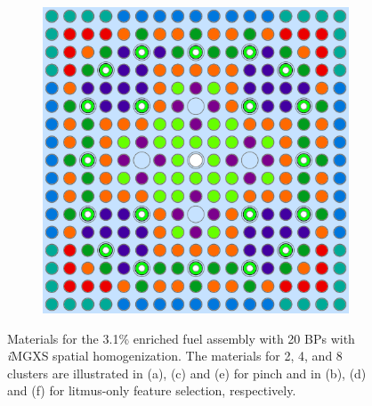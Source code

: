 \begin{figure}[h!]
\begin{subfigure}{0.47\textwidth}
  \caption{}
  \label{fig:chap10-assm-31-20BPs-pinch-8}
\end{subfigure}%
\begin{subfigure}{0.47\textwidth}
  \centering
  \includegraphics[width=0.9\linewidth]{figures/unsupervised/geometries/with-features/8-clusters/combined/assm-31-20BPs}
  \caption{}
  \label{fig:chap10-assm-31-20BPs-combined-8}
\end{subfigure}
\caption[Materials for the 3.1\% fuel assembly with \textit{i}\ac{MGXS} homogenization]{Materials for the 3.1\% enriched fuel assembly with 20 \acp{BP} with \textit{i}\ac{MGXS} spatial homogenization. The materials for 2, 4, and 8 clusters are illustrated in (a), (c) and (e) for pinch and in (b), (d) and (f) for litmus-only feature selection, respectively.}
\label{fig:chap10-assm-31-20BPs-geometries}
\end{figure}

\clearpage

